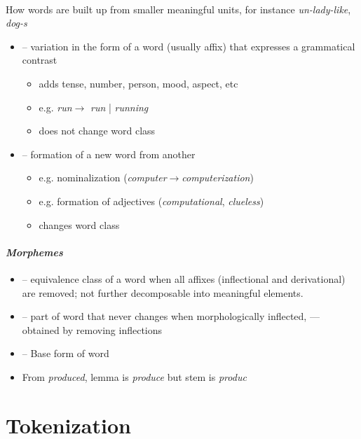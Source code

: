 \documentclass[10pt,twocolumn]{article}
\begin{document}
\paragraph{} How words are built up from smaller meaningful
units, for instance \textit{un-lady-like}, \textit{dog-s}
\begin{itemize}
\item \textbf{} -- variation in the form of a word (usually affix)
  that expresses a grammatical contrast
  \begin{itemize}
  \item adds tense, number, person, mood, aspect, etc
  \item e.g. \textit{run}$\rightarrow$ \textit{run} | \textit{running} 
  \item does not change word class
  \end{itemize}
\item \textbf{} -- formation of a new word from another
  \begin{itemize}
  \item e.g. nominalization (\textit{computer}$\rightarrow$\textit{computerization})
  \item e.g. formation of adjectives (\textit{computational}, \textit{clueless})
  \item changes word class
  \end{itemize}
\end{itemize}

\paragraph{\textit{Morphemes}}
\begin{itemize}
\item \textbf{} -- equivalence class of a word when all affixes (inflectional and derivational) are removed; not further decomposable into meaningful elements. 
\item \textbf{} -- part of word that never changes when
  morphologically inflected,  --- obtained by removing inflections
\item \textbf{} -- Base form of word
\item From \textit{produced}, lemma is \textit{produce} but stem is \textit{produc}
\end{itemize}


\section{Tokenization}
 
\end{document}
